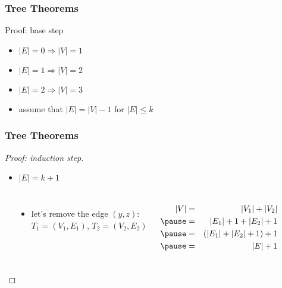 \documentclass[dvipsnames]{beamer}
\begin{document}
\begin{frame}
  \frametitle{Tree Theorems}

  \begin{block}{Proof: base step}
    \begin{itemize}
      \item $|E|=0 \Rightarrow |V|=1$
      \item $|E|=1 \Rightarrow |V|=2$
      \item $|E|=2 \Rightarrow |V|=3$

      \pause
      \medskip
      \item assume that $|E| = |V| - 1$ for $|E| \leq k$
    \end{itemize}
  \end{block}
\end{frame}

\begin{frame}
  \frametitle{Tree Theorems}

  \begin{proof}[Proof: induction step]
    \begin{itemize}
      \item $|E|=k+1$
    \end{itemize}

    \begin{columns}[t]
      \begin{center}
      \end{center}

      \pause
      \begin{itemize}
        \item let's remove the edge $(y,z)$:\\
          $T_1=(V_1,E_1)$, $T_2=(V_2,E_2)$
      \end{itemize}
      \pause
      \begin{eqnarray*}
        |V| & = & |V_1|+|V_2|\\\pause
            & = & |E_1|+1+|E_2|+1\\\pause
            & = & (|E_1|+|E_2|+1)+1\\\pause
            & = & |E|+1
      \end{eqnarray*}
    \end{columns}
  \end{proof}
\end{frame}
\end{document}
